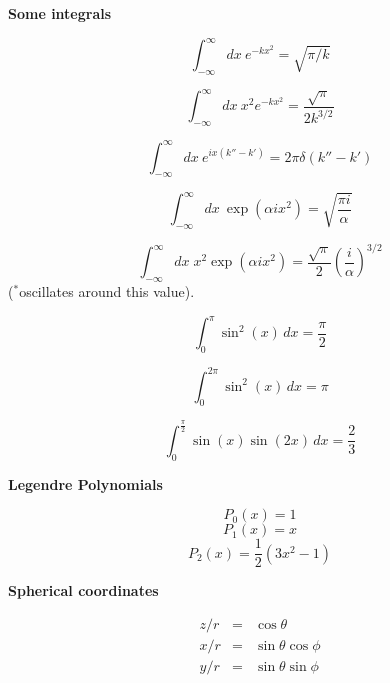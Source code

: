 \documentclass[11pt]{article}
\begin{document}
\begin{multicols}{2}
{\bf Some integrals}

\begin{equation}
\int_{-\infty}^{\infty} dx \: e^{-kx^2} = \sqrt{\pi/k}
\end{equation}

\begin{equation}
\int_{-\infty}^{\infty} dx \: x^2 e^{-kx^2} = \frac{\sqrt{\pi}}{2 k^{3/2}}
\end{equation}

\begin{equation}
\int_{-\infty}^{\infty} dx \: e^{ix(k''-k')} = 2 \pi \delta (k''-k')
\end{equation}

\begin{equation}
\int_{-\infty}^{\infty} dx \: \exp (\alpha i x^2) = \sqrt{\frac{\pi i}{\alpha}}
\label{eq:simp_int}
\end{equation}

\begin{equation}
\int_{-\infty}^{\infty} dx \; x^2 \exp (\alpha i x^2)
  = \frac{\sqrt{\pi}}{2} \left( \frac{i}{\alpha} \right)^{3/2}
\label{eq:2nd_simp_int}
\end{equation}
{\small ($^{*}$oscillates around this value)}.

\begin{equation}
\int_{0}^{\pi} \sin^{2}{\left (x \right )}\, dx  =  \frac{\pi}{2}
\end{equation}

\begin{equation}
\int_{0}^{2 \pi} \sin^{2}{\left (x \right )}\, dx  =  \pi
\end{equation}

\begin{equation}
\int_{0}^{\frac{\pi}{2}} \sin{\left (x \right )} \sin{\left (2 x \right )}\, dx  =  \frac{2}{3}
\end{equation}

{\bf Legendre Polynomials}

\begin{equation}
P_0(x) = 1
\end{equation}
\begin{equation}
P_1(x) = x
\end{equation}
\begin{equation}
P_2(x) = \frac{1}{2} (3x^2-1)
\end{equation}

{\bf Spherical coordinates}

\begin{eqnarray}
z/r & = & \cos \theta \\
x/r & = & \sin \theta \cos \phi \\
y/r & = & \sin \theta \sin \phi
\end{eqnarray}

\end{multicols}
\end{document}
